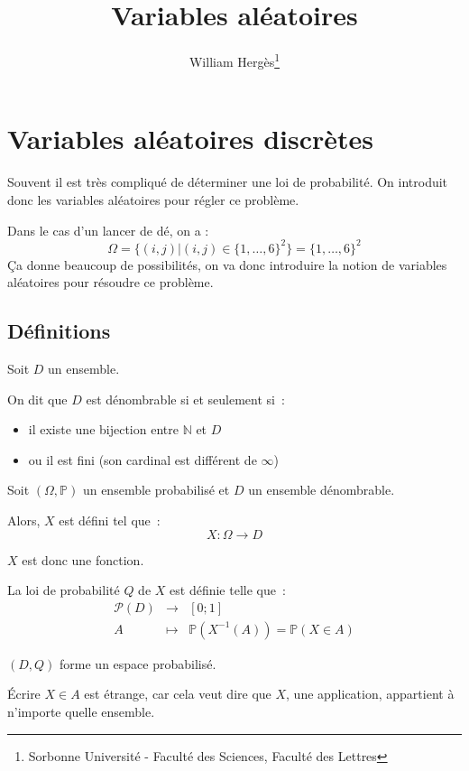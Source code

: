 \documentclass[a4paper, titlepage]{article}
\title{Variables aléatoires}
\author{William Hergès\thanks{Sorbonne Université - Faculté des Sciences, Faculté des Lettres}}
\begin{document}
	\maketitle
	\tableofcontents
	\newpage
	\section{Variables aléatoires discrètes}
	Souvent il est très compliqué de déterminer une loi de probabilité. On introduit donc les variables aléatoires pour régler ce problème.

	Dans le cas d'un lancer de dé, on a :
	$$ \Omega = \{(i,j)|(i,j)\in\{1,\ldots,6\}^2\} = \{1,\ldots,6\}^2 $$
	Ça donne beaucoup de possibilités, on va donc introduire la notion de variables aléatoires pour résoudre ce problème.

	\subsection{Définitions}
	\begin{defn}
		Soit $D$ un ensemble.

		On dit que $D$ est dénombrable si et seulement si~:
		\begin{itemize}
			\item il existe une bijection entre $\mathbb{N}$ et $D$
			\item ou il est fini (son cardinal est différent de $\infty$)
		\end{itemize}
	\end{defn}

	\begin{defn}
		Soit $(\Omega,\mathbb{P})$ un ensemble probabilisé et $D$ un ensemble dénombrable.

		Alors, $X$ est défini tel que~:
		$$ X:\Omega \to D $$
	\end{defn}
	$X$ est donc une fonction.

	\begin{defn}
		La loi de probabilité $Q$ de $X$ est définie telle que~:
		$$\begin{matrix}
			\mathcal{P}(D) &\to &[0;1]\\
			A & \longmapsto & \mathbb{P}(X^{-1}(A)) = \mathbb{P}(X\in A)
		\end{matrix}$$
	\end{defn}
	$(D,Q)$ forme un espace probabilisé.
	
	Écrire $X\in A$ est étrange, car cela veut dire que $X$, une application, appartient à n'importe quelle ensemble.
\end{document}
